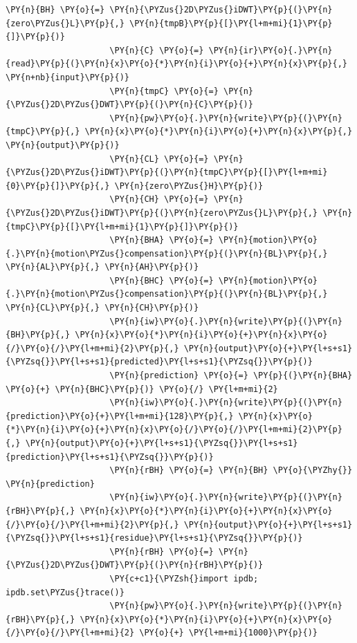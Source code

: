 \begin{Verbatim}[commandchars=\\\{\}]
                     \PY{n}{BH} \PY{o}{=} \PY{n}{\PYZus{}2D\PYZus{}iDWT}\PY{p}{(}\PY{n}{zero\PYZus{}L}\PY{p}{,} \PY{n}{tmpB}\PY{p}{[}\PY{l+m+mi}{1}\PY{p}{]}\PY{p}{)}
                     \PY{n}{C} \PY{o}{=} \PY{n}{ir}\PY{o}{.}\PY{n}{read}\PY{p}{(}\PY{n}{x}\PY{o}{*}\PY{n}{i}\PY{o}{+}\PY{n}{x}\PY{p}{,} \PY{n+nb}{input}\PY{p}{)}
                     \PY{n}{tmpC} \PY{o}{=} \PY{n}{\PYZus{}2D\PYZus{}DWT}\PY{p}{(}\PY{n}{C}\PY{p}{)}
                     \PY{n}{pw}\PY{o}{.}\PY{n}{write}\PY{p}{(}\PY{n}{tmpC}\PY{p}{,} \PY{n}{x}\PY{o}{*}\PY{n}{i}\PY{o}{+}\PY{n}{x}\PY{p}{,} \PY{n}{output}\PY{p}{)}
                     \PY{n}{CL} \PY{o}{=} \PY{n}{\PYZus{}2D\PYZus{}iDWT}\PY{p}{(}\PY{n}{tmpC}\PY{p}{[}\PY{l+m+mi}{0}\PY{p}{]}\PY{p}{,} \PY{n}{zero\PYZus{}H}\PY{p}{)}
                     \PY{n}{CH} \PY{o}{=} \PY{n}{\PYZus{}2D\PYZus{}iDWT}\PY{p}{(}\PY{n}{zero\PYZus{}L}\PY{p}{,} \PY{n}{tmpC}\PY{p}{[}\PY{l+m+mi}{1}\PY{p}{]}\PY{p}{)}
                     \PY{n}{BHA} \PY{o}{=} \PY{n}{motion}\PY{o}{.}\PY{n}{motion\PYZus{}compensation}\PY{p}{(}\PY{n}{BL}\PY{p}{,} \PY{n}{AL}\PY{p}{,} \PY{n}{AH}\PY{p}{)}
                     \PY{n}{BHC} \PY{o}{=} \PY{n}{motion}\PY{o}{.}\PY{n}{motion\PYZus{}compensation}\PY{p}{(}\PY{n}{BL}\PY{p}{,} \PY{n}{CL}\PY{p}{,} \PY{n}{CH}\PY{p}{)}
                     \PY{n}{iw}\PY{o}{.}\PY{n}{write}\PY{p}{(}\PY{n}{BH}\PY{p}{,} \PY{n}{x}\PY{o}{*}\PY{n}{i}\PY{o}{+}\PY{n}{x}\PY{o}{/}\PY{o}{/}\PY{l+m+mi}{2}\PY{p}{,} \PY{n}{output}\PY{o}{+}\PY{l+s+s1}{\PYZsq{}}\PY{l+s+s1}{predicted}\PY{l+s+s1}{\PYZsq{}}\PY{p}{)}
                     \PY{n}{prediction} \PY{o}{=} \PY{p}{(}\PY{n}{BHA} \PY{o}{+} \PY{n}{BHC}\PY{p}{)} \PY{o}{/} \PY{l+m+mi}{2}
                     \PY{n}{iw}\PY{o}{.}\PY{n}{write}\PY{p}{(}\PY{n}{prediction}\PY{o}{+}\PY{l+m+mi}{128}\PY{p}{,} \PY{n}{x}\PY{o}{*}\PY{n}{i}\PY{o}{+}\PY{n}{x}\PY{o}{/}\PY{o}{/}\PY{l+m+mi}{2}\PY{p}{,} \PY{n}{output}\PY{o}{+}\PY{l+s+s1}{\PYZsq{}}\PY{l+s+s1}{prediction}\PY{l+s+s1}{\PYZsq{}}\PY{p}{)}
                     \PY{n}{rBH} \PY{o}{=} \PY{n}{BH} \PY{o}{\PYZhy{}} \PY{n}{prediction}
                     \PY{n}{iw}\PY{o}{.}\PY{n}{write}\PY{p}{(}\PY{n}{rBH}\PY{p}{,} \PY{n}{x}\PY{o}{*}\PY{n}{i}\PY{o}{+}\PY{n}{x}\PY{o}{/}\PY{o}{/}\PY{l+m+mi}{2}\PY{p}{,} \PY{n}{output}\PY{o}{+}\PY{l+s+s1}{\PYZsq{}}\PY{l+s+s1}{residue}\PY{l+s+s1}{\PYZsq{}}\PY{p}{)}
                     \PY{n}{rBH} \PY{o}{=} \PY{n}{\PYZus{}2D\PYZus{}DWT}\PY{p}{(}\PY{n}{rBH}\PY{p}{)}
                     \PY{c+c1}{\PYZsh{}import ipdb; ipdb.set\PYZus{}trace()}
                     \PY{n}{pw}\PY{o}{.}\PY{n}{write}\PY{p}{(}\PY{n}{rBH}\PY{p}{,} \PY{n}{x}\PY{o}{*}\PY{n}{i}\PY{o}{+}\PY{n}{x}\PY{o}{/}\PY{o}{/}\PY{l+m+mi}{2} \PY{o}{+} \PY{l+m+mi}{1000}\PY{p}{)}

\end{Verbatim}
